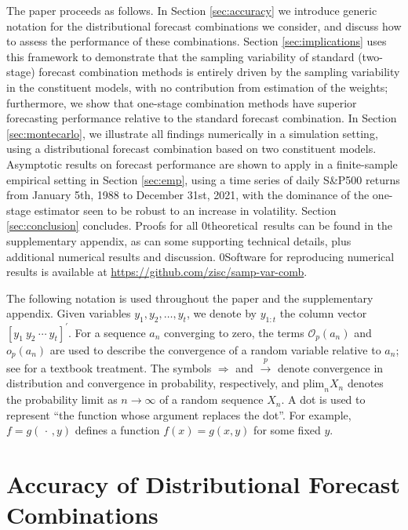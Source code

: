 \documentclass[12pt]{article}
\newcommand{\blind}{0}
\theoremstyle{definition}
\theoremstyle{remark}
\begin{document}
{The paper proceeds as follows. In Section \ref{sec:accuracy} we introduce generic notation for the distributional forecast combinations we consider, and discuss how to assess the performance of these combinations. Section \ref{sec:implications} uses this framework to demonstrate that the sampling variability of standard (two-stage) forecast combination methods is entirely driven by the sampling variability in the constituent models, with no contribution from estimation of the weights; furthermore, we show that one-stage combination methods have superior forecasting performance relative to the standard forecast combination. In Section \ref{sec:montecarlo}, we illustrate all findings numerically in a simulation setting, using a distributional forecast combination based on two constituent models. Asymptotic results on forecast performance are shown to apply in a finite-sample empirical setting in Section \ref{sec:emp}, using a time series of daily S\&P500 returns from January 5th, 1988 to December 31st, 2021, with the dominance of the one-stage estimator seen to be robust to an increase in volatility. Section \ref{sec:conclusion} concludes. Proofs for all \blind{theoretical\ }\fi results can be found in the supplementary appendix, as can some supporting technical details, plus additional numerical results and discussion. \blind{Software for reproducing numerical results is available at \href{https://github.com/zisc/samp-var-comb}{https://github.com/zisc/samp-var-comb}.}\fi

The following notation is used throughout the paper and the supplementary appendix. Given variables $y_{1},y_{2},\ldots ,y_{t}$, we denote by $y_{1:t}$ the column vector $[y_{1}\ y_{2}\ \cdots \ y_{t}]^{\prime }$. For a sequence $a_{n}$ converging to zero, the terms $\mathcal{O}_{p}(a_{n})$ and $o_{p}(a_{n})$ are used to describe the convergence of a random variable relative to $a_{n}$; see \cite{VanDerVaart1998} for a textbook treatment. The symbols $\Rightarrow $ and $\overset{p}{\rightarrow }$ denote convergence in distribution and convergence in probability, respectively, and $\mathrm{plim}_n X_n$ denotes the probability limit as $n \to \infty$ of a random sequence $X_n$. A dot is used to represent \textquotedblleft the function whose argument replaces the dot\textquotedblright . For example, $f=g(\,\cdot \,,y)$ defines a function $f(x)=g(x,y)$ for some fixed $y$.

\section{Accuracy of Distributional Forecast Combinations\label{sec:accuracy}}

}
\end{document}
